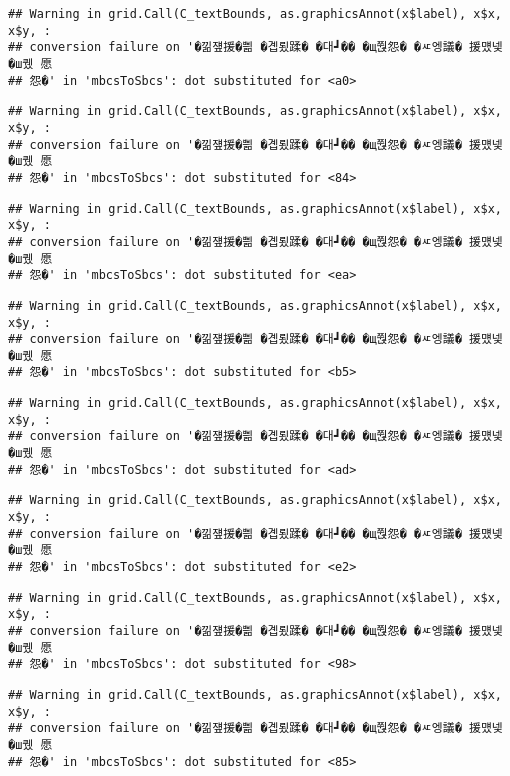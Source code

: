 \documentclass[
]{article}
\begin{document}
\begin{verbatim}
## Warning in grid.Call(C_textBounds, as.graphicsAnnot(x$label), x$x, x$y, :
## conversion failure on '�낆쟾援�쁾 �곕룄蹂� �대┛�� �щ쭩怨� �ㅼ엥議� 援먰넻�ш퀬 愿
## 怨�' in 'mbcsToSbcs': dot substituted for <a0>
\end{verbatim}

\begin{verbatim}
## Warning in grid.Call(C_textBounds, as.graphicsAnnot(x$label), x$x, x$y, :
## conversion failure on '�낆쟾援�쁾 �곕룄蹂� �대┛�� �щ쭩怨� �ㅼ엥議� 援먰넻�ш퀬 愿
## 怨�' in 'mbcsToSbcs': dot substituted for <84>
\end{verbatim}

\begin{verbatim}
## Warning in grid.Call(C_textBounds, as.graphicsAnnot(x$label), x$x, x$y, :
## conversion failure on '�낆쟾援�쁾 �곕룄蹂� �대┛�� �щ쭩怨� �ㅼ엥議� 援먰넻�ш퀬 愿
## 怨�' in 'mbcsToSbcs': dot substituted for <ea>
\end{verbatim}

\begin{verbatim}
## Warning in grid.Call(C_textBounds, as.graphicsAnnot(x$label), x$x, x$y, :
## conversion failure on '�낆쟾援�쁾 �곕룄蹂� �대┛�� �щ쭩怨� �ㅼ엥議� 援먰넻�ш퀬 愿
## 怨�' in 'mbcsToSbcs': dot substituted for <b5>
\end{verbatim}

\begin{verbatim}
## Warning in grid.Call(C_textBounds, as.graphicsAnnot(x$label), x$x, x$y, :
## conversion failure on '�낆쟾援�쁾 �곕룄蹂� �대┛�� �щ쭩怨� �ㅼ엥議� 援먰넻�ш퀬 愿
## 怨�' in 'mbcsToSbcs': dot substituted for <ad>
\end{verbatim}

\begin{verbatim}
## Warning in grid.Call(C_textBounds, as.graphicsAnnot(x$label), x$x, x$y, :
## conversion failure on '�낆쟾援�쁾 �곕룄蹂� �대┛�� �щ쭩怨� �ㅼ엥議� 援먰넻�ш퀬 愿
## 怨�' in 'mbcsToSbcs': dot substituted for <e2>
\end{verbatim}

\begin{verbatim}
## Warning in grid.Call(C_textBounds, as.graphicsAnnot(x$label), x$x, x$y, :
## conversion failure on '�낆쟾援�쁾 �곕룄蹂� �대┛�� �щ쭩怨� �ㅼ엥議� 援먰넻�ш퀬 愿
## 怨�' in 'mbcsToSbcs': dot substituted for <98>
\end{verbatim}

\begin{verbatim}
## Warning in grid.Call(C_textBounds, as.graphicsAnnot(x$label), x$x, x$y, :
## conversion failure on '�낆쟾援�쁾 �곕룄蹂� �대┛�� �щ쭩怨� �ㅼ엥議� 援먰넻�ш퀬 愿
## 怨�' in 'mbcsToSbcs': dot substituted for <85>
\end{verbatim}
\end{document}
